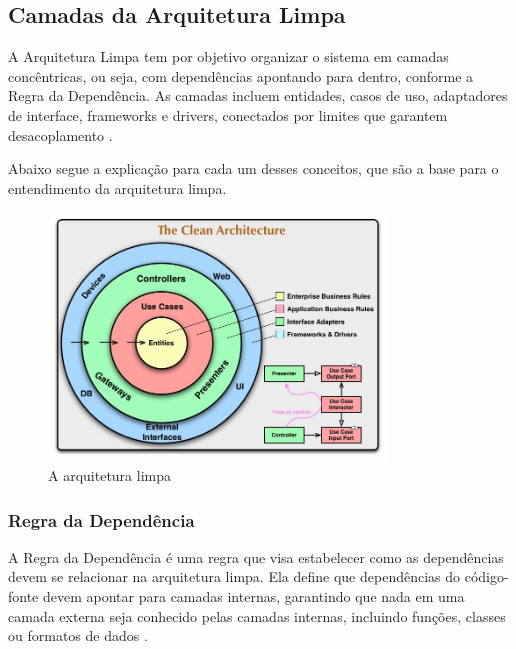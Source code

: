     \subsection{Camadas da Arquitetura Limpa}
        \par A Arquitetura Limpa tem por objetivo organizar o sistema em camadas concêntricas, ou seja, com dependências apontando para dentro, conforme a Regra da Dependência. As camadas incluem entidades, casos de uso, adaptadores de interface, frameworks e drivers, conectados por limites que garantem desacoplamento \cite{livro:martin:cleanarch}.
        
        \par Abaixo segue a explicação para cada um desses conceitos, que são a base para o entendimento da arquitetura limpa.

         \begin{figure}[H] %
            \centering
            \includegraphics[width=0.8\textwidth]{figuras/clean_arch_1.jpg}
            \caption{A arquitetura limpa}
            \label{fig:figura_clean_arch_1}
            \newcommand{\source}{Fonte: \cite{livro:martin:cleanarch}}
        \end{figure}
        
        \subsubsection{Regra da Dependência}
        
            \par A Regra da Dependência é uma regra que visa estabelecer como as dependências devem se relacionar na arquitetura limpa. Ela define que dependências do código-fonte devem apontar para camadas internas, garantindo que nada em uma camada externa seja conhecido pelas camadas internas, incluindo funções, classes ou formatos de dados \cite{livro:martin:cleanarch}. 

